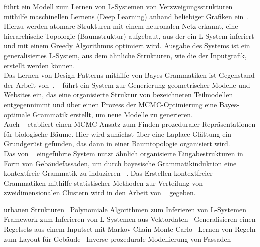 \citeauthor{guo_2020} führt ein Modell zum Lernen von L-Systemen von Verzweigungsstrukturen mithilfe maschinellen
Lernens (Deep Learning) anhand beliebiger Grafiken ein~\cite{guo_2020}.
Hierzu werden atomare Strukturen mit einem neuronalen Netz erkannt, eine hierarchische Topologie (Baumstruktur)
aufgebaut, aus der ein L-System inferiert und mit einem Greedy Algorithmus optimiert wird.
Ausgabe des Systems ist ein generalisiertes L-System, aus dem ähnliche Strukturen, wie die der Inputgrafik,
erstellt werden können.\\
Das Lernen von Design-Patterns mithilfe von Bayes-Grammatiken ist Gegenstand der Arbeit von~\citeauthor{talton_2012}.
~\cite{talton_2012} führt ein System zur Generierung geometrischer Modelle und Websites ein, das eine organisierte
Struktur von bezeichneten Teilmodellen entgegennimmt und über einen Prozess der MCMC-Optimierung eine Bayes-optimale
Grammatik erstellt, um neue Modelle zu generieren.\\
Auch ~\cite{stava_2014} etabliert einen MCMC-Ansatz zum Finden prozeduraler Repräsentationen für biologische Bäume.
Hier wird zunächst über eine Laplace-Glättung ein Grundgerüst gefunden, das dann in einer Baumtopologie organisiert wird.\\
Das von ~\citeauthor{martinovic_2013} eingeführte System nutzt ähnlich organisierte Eingabestrukturen in Form von
Gebäudefassaden, um durch bayesische Grammatikinduktion eine kontextfreie Grammatik zu induzieren ~\cite{martinovic_2013}.
Das Erstellen kontextfreier Grammatiken mithilfe statistischer Methoden zur Verteilung von zweidimensionalen Clustern
wird in den Arbeit von ~\citeauthor{stava_2010} gegeben.

urbanen Strukturen~\cite{nishida_2016}
Polynomiale Algorithmen zum Inferieren von L-Systemen~\cite{mcquillan_2018}
Framework zum Inferieren von L-Systemen aus Vektordaten~\cite{stava_2010}
Generalisieren einen Regelsets aus einem Inputset mit Markov Chain Monte Carlo~\cite{talton_2012, talton_2011}
Lernen von Regeln zum Layout für Gebäude~\cite{martinovic_2013}
Inverse prozedurale Modellierung von Fassaden~\cite{xiao_2008}